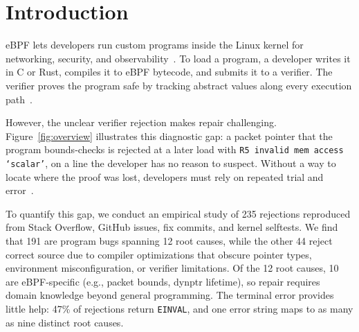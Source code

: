\section{Introduction}
\label{sec:introduction}

eBPF lets developers run custom programs inside the Linux kernel for networking, security, and observability~\cite{gbadamosi2024ebpf, cilium}.
To load a program, a developer writes it in C or Rust, compiles it to eBPF bytecode, and submits it to a verifier. The verifier proves the program safe by tracking abstract values along every execution path~\cite{gershuni2019simple, linuxkernel-bpf-verifier}.

However, the unclear verifier rejection makes repair challenging.
Figure~\ref{fig:overview} illustrates this diagnostic gap: a packet pointer that the program bounds-checks is rejected at a later load with \texttt{R5 invalid mem access `scalar'}, on a line the developer has no reason to suspect.
Without a way to locate where the proof was lost, developers must rely on repeated trial and error~\cite{deokar2024empirical}.

To quantify this gap, we conduct an empirical study of 235 rejections reproduced from Stack Overflow, GitHub issues, fix commits, and kernel selftests.
We find that 191 are program bugs spanning 12 root causes, while the other 44 reject correct source due to compiler optimizations that obscure pointer types, environment misconfiguration, or verifier limitations.
Of the 12 root causes, 10 are eBPF-specific (e.g., packet bounds, dynptr lifetime), so repair requires domain knowledge beyond general programming.
The terminal error provides little help: 47\% of rejections return \texttt{EINVAL}, and one error string maps to as many as nine distinct root causes.

